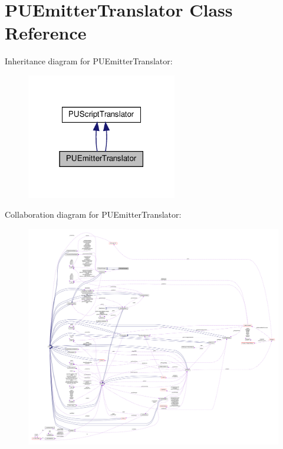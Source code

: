 \hypertarget{classPUEmitterTranslator}{}\section{P\+U\+Emitter\+Translator Class Reference}
\label{classPUEmitterTranslator}


Inheritance diagram for P\+U\+Emitter\+Translator\+:
\nopagebreak
\begin{figure}[H]
\begin{center}
\leavevmode
\includegraphics[width=186pt]{classPUEmitterTranslator__inherit__graph}
\end{center}
\end{figure}


Collaboration diagram for P\+U\+Emitter\+Translator\+:
\nopagebreak
\begin{figure}[H]
\begin{center}
\leavevmode
\includegraphics[width=350pt]{classPUEmitterTranslator__coll__graph}
\end{center}
\end{figure}
